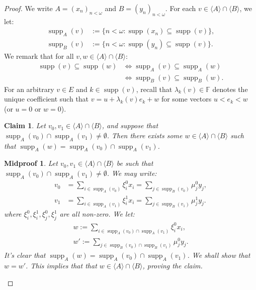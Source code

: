 \documentclass[10pt,a4paper]{amsart}
\newtheorem{claim}{Claim}
\newtheorem{midproof}{Midproof}
\renewcommand{\c}[1]{\langle #1 \rangle}
\newcommand{\func}{\operatorname}
\newcommand{\supp}{\func{supp}}
\begin{document}
\begin{proof}
    We write $A = (x_n)_{n<\omega}$ and $B = (y_n)_{n<\omega}$. For each $v \in \c{A} \cap \c{B}$, we let:
    \begin{align*}
        \supp_A(v) &:= \{n < \omega : \supp(x_n) \subseteq \supp(v)\}, \\
        \supp_B(v) &:= \{n < \omega : \supp(y_n) \subseteq \supp(v)\}.
    \end{align*}
    We remark that for all $v,w \in \c{A} \cap \c{B}$:
    \begin{align*}
        \supp(v) \subseteq \supp(w) &\iff \supp_A(v) \subseteq \supp_A(w) \\
        &\iff \supp_B(v) \subseteq \supp_B(w).
    \end{align*}
    For an arbitrary $v \in E$ and $k \in \supp(v)$, recall that $\lambda_k(v) \in \mathbb{F}$ denotes the unique coefficient such that $v = u + \lambda_k(v)e_k + w$ for some vectors $u < e_k < w$ (or $u = 0$ or $w = 0$).

    \begin{claim}
    \label{claim:supp(v).intersection}
        Let $v_0,v_1 \in \c{A} \cap \c{B}$, and suppose that $\supp_A(v_0) \cap \supp_A(v_1) \neq \emptyset$. Then there exists some $w \in \c{A} \cap \c{B}$ such that $\supp_A(w) = \supp_A(v_0) \cap \supp_A(v_1)$.
    \end{claim}

    \begin{midproof}
        Let $v_0,v_1 \in \c{A} \cap \c{B}$ be such that $\supp_A(v_0) \cap \supp_A(v_1) \neq \emptyset$. We may write:
        \begin{align}
            v_0 &= \sum_{i \in \supp_A(v_0)} \xi_i^0x_i = \sum_{j \in \supp_B(v_0)} \mu_j^0y_j, \label{eq:v_0} \\
            v_1 &= \sum_{i \in \supp_A(v_1)} \xi_i^1x_i = \sum_{j \in \supp_B(v_1)} \mu_j^1y_j. \label{eq:v_1}
        \end{align}
        where $\xi_i^0,\xi_i^1,\xi_j^0,\xi_j^1$ are all non-zero. We let:
        \begin{align*}
            w := \sum_{i \in \supp_A(v_0) \cap \supp_A(v_1)} \xi_i^0 x_i, \\
            w' := \sum_{j \in \supp_B(v_0) \cap \supp_B(v_1)} \mu_j^0 y_j.
        \end{align*}
        It's clear that $\supp_A(w) = \supp_A(v_0) \cap \supp_A(v_1)$. We shall show that $w = w'$. This implies that that $w \in \c{A} \cap \c{B}$, proving the claim.


\end{midproof}
\end{proof}
\end{document}

